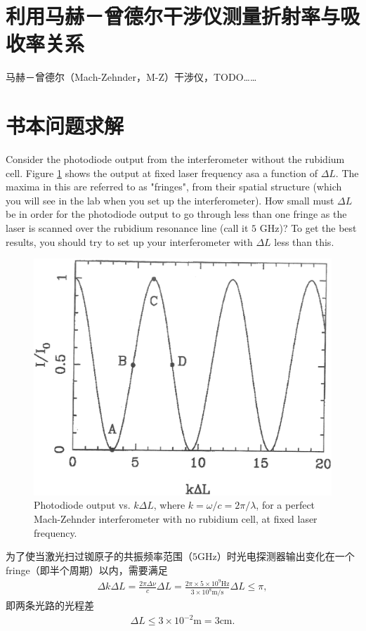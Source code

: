 \documentclass{assignment}
\begin{document}
\section{利用马赫－曾德尔干涉仪测量折射率与吸收率关系}
马赫－曾德尔（Mach-Zehnder，M-Z）干涉仪，TODO……

\section{书本问题求解}
\begin{prob}
    Consider the photodiode output from the interferometer without the rubidium cell. Figure \ref{InterferometricOutputWithoutRbCell} shows the output at fixed laser frequency asa a function of $\Delta L$. The maxima in this are referred to as "fringes", from their spatial structure (which you will see in the lab when you set up the interferometer). How small must $\Delta L$ be in order for the photodiode output to go through less than one fringe as the laser is scanned over the rubidium resonance line (call it $5$ GHz)? To get the best results, you should try to set up your interferometer with $\Delta L$ less than this.
    \begin{figure}[h]
        \centering
        \includegraphics[width=.5\textwidth]{InterferometricOutputWithoutRbCell.png}
        \caption{Photodiode output vs. $k\Delta L$, where $k=\omega/c=2\pi/\lambda$, for a perfect Mach-Zehnder interferometer with no rubidium cell, at fixed laser frequency.}
        \label{InterferometricOutputWithoutRbCell}
    \end{figure}
\end{prob}
\begin{sol}
    为了使当激光扫过铷原子的共振频率范围（$5$GHz）时光电探测器输出变化在一个fringe（即半个周期）以内，需要满足
    \begin{align}
        \Delta k\Delta L=\frac{2\pi\Delta\nu}{c}\Delta L=\frac{2\pi\times 5\times 10^9\text{Hz}}{3\times 10^8\text{m/s}}\Delta L\leq\pi,
    \end{align}
    即两条光路的光程差
    \begin{align}
        \Delta L\leq 3\times 10^{-2}\text{m}=3\text{cm}.
    \end{align}
\end{sol}
\end{document}
